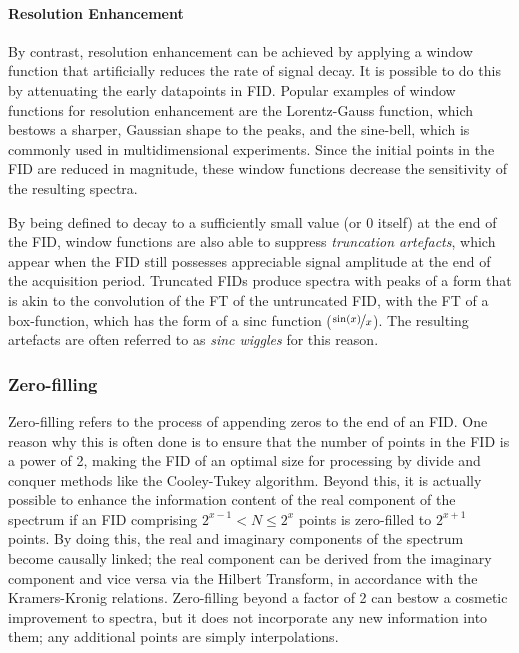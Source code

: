 \paragraph{Resolution Enhancement} By contrast, resolution enhancement can be
achieved by applying a window function that artificially reduces the rate of
signal decay. It is possible to do this by attenuating the early datapoints in
\ac{FID}. Popular examples of window functions for resolution enhancement are
the Lorentz-Gauss function, which bestows a sharper, Gaussian shape to the
peaks, and the sine-bell, which is commonly used in multidimensional
experiments.  Since the initial points in the \ac{FID} are reduced in
magnitude, these window functions decrease the sensitivity of the resulting
spectra.

By being defined to decay to a sufficiently small value (or $0$ itself) at the
end of
the \ac{FID}, window functions are also able to suppress \emph{truncation
artefacts}, which appear when the \ac{FID} still possesses appreciable signal
amplitude at the end of the acquisition period. Truncated \acp{FID} produce
spectra with peaks of a form that is akin to the convolution of the \ac{FT} of
the untruncated \ac{FID}, with the \ac{FT} of a box-function, which has the
form of a sinc function ($\nicefrac{\sin(x)}{x}$). The resulting artefacts
are often referred to as \emph{sinc wiggles} for this reason.

\subsubsection{Zero-filling}
Zero-filling refers to the process of appending zeros to the end of an
\ac{FID}. One reason why this is often done is to ensure that the number of
points in the \ac{FID} is a power of 2, making the \ac{FID} of an optimal size
for processing by divide and conquer methods like the Cooley-Tukey
algorithm\cite{Cooley1965}. Beyond this, it is actually
possible to enhance the information content of the real component of the
spectrum if an \ac{FID} comprising $2^{x-1} < N \leq 2^x$ points is zero-filled
to $2^{x+1}$ points\cite{Bartholdi1973}. By doing this, the real and imaginary
components of
the spectrum become causally linked; the real component can be derived from the
imaginary component and vice versa via the Hilbert Transform, in accordance
with the Kramers-Kronig relations.
Zero-filling beyond a factor of 2 can bestow a
cosmetic improvement to spectra, but it does not incorporate any new
information into them; any additional points are simply interpolations.

